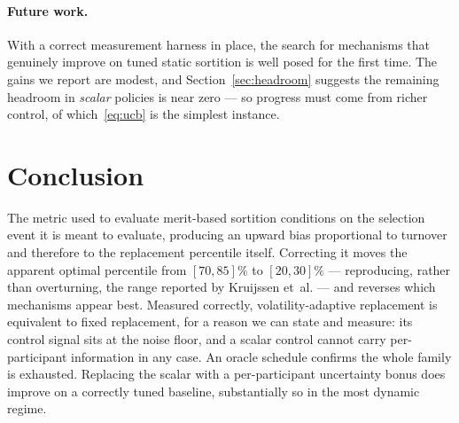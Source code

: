 \documentclass[10pt,twocolumn]{article}
\begin{document}
\paragraph{Future work.}
With a correct measurement harness in place, the search for mechanisms that genuinely
improve on tuned static sortition is well posed for the first time. The gains we report
are modest, and Section~\ref{sec:headroom} suggests the remaining headroom in
\emph{scalar} policies is near zero --- so progress must come from richer control, of
which~\eqref{eq:ucb} is the simplest instance.

\section{Conclusion}

The metric used to evaluate merit-based sortition conditions on the selection event it
is meant to evaluate, producing an upward bias proportional to turnover and therefore to
the replacement percentile itself. Correcting it moves the apparent optimal percentile
from $[70,85]\%$ to $[20,30]\%$ --- reproducing, rather than overturning, the range
reported by Kruijssen et~al. --- and reverses which mechanisms appear best. Measured
correctly, volatility-adaptive replacement is equivalent to fixed replacement, for a
reason we can state and measure: its control signal sits at the noise floor, and a
scalar control cannot carry per-participant information in any case. An oracle schedule
confirms the whole family is exhausted. Replacing the scalar with a per-participant
uncertainty bonus does improve on a correctly tuned baseline, substantially so in the
most dynamic regime.
\end{document}
